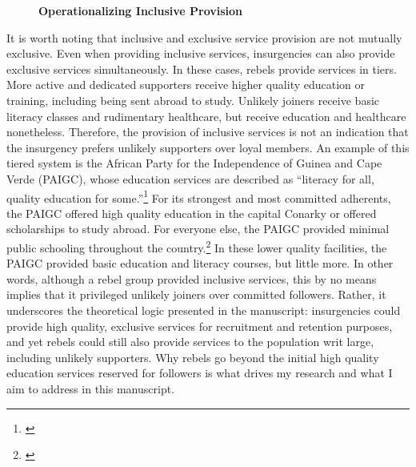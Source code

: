 \documentclass[12pt, letterpaper]{article}
\begin{document}
\begin{figure}[h!]
\centering
\begin{center}
\renewcommand\thefigure{A.\arabic{figure}}
\caption{\textbf{Operationalizing Inclusive Provision}}
\label{figure:coding}
\end{center}
\end{figure}

It is worth noting that inclusive and exclusive service provision are not mutually exclusive. Even when providing inclusive services, insurgencies can also provide exclusive services simultaneously. In these cases, rebels provide services in tiers. More active and dedicated supporters receive higher quality education or training, including being sent abroad to study. Unlikely joiners receive basic literacy classes and rudimentary healthcare, but receive education and healthcare nonetheless. Therefore, the provision of inclusive services is not an indication that the insurgency prefers unlikely supporters over loyal members. An example of this tiered system is the African Party for the Independence of Guinea and Cape Verde (PAIGC), whose education services are described as ``literacy for all, quality education for some.''\footnote{\citealt[97]{dhada1993warriors}} For its strongest and most committed adherents, the PAIGC offered high quality education in the capital Conarky or offered scholarships to study abroad. For everyone else, the PAIGC provided minimal public schooling throughout the country.\footnote{\citealt[106-7]{dhada1993warriors}} In these lower quality facilities, the PAIGC provided basic education and literacy courses, but little more. In other words, although a rebel group provided inclusive services, this by no means implies that it privileged unlikely joiners over committed followers. Rather, it underscores the theoretical logic presented in the manuscript: insurgencies could provide high quality, exclusive services for recruitment and retention purposes, and yet rebels could still also provide services to the population writ large, including unlikely supporters. Why rebels go beyond the initial high quality education services reserved for followers is what drives my research and what I aim to address in this manuscript.
\end{document}
